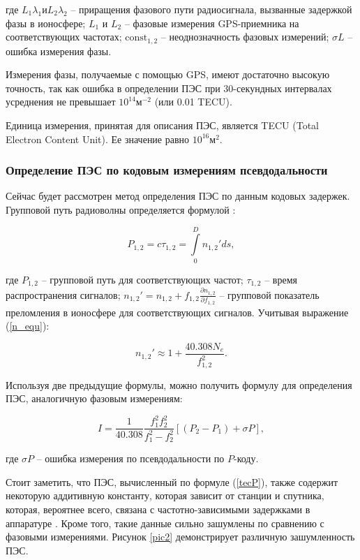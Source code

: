 \documentclass[a4paper]{article}
\begin{document}
где $L_1\lambda_1 \text{и} L_2 \lambda_2$ -- приращения фазового пути радиосигнала, вызванные задержкой фазы в ионосфере; $L_1$ и $L_2$ -- фазовые измерения GPS-приемника на соответствующих частотах; $\text{const}_{1,2}$ -- неоднозначность фазовых измерений; $\sigma L$ -- ошибка измерения фазы.

Измерения фазы, получаемые с помощью GPS, имеют достаточно высокую точность, так как ошибка в определении ПЭС при 30-секундных интервалах усреднения не превышает $10^{14} \text{м}^{-2}$ (или 0.01 TECU). 

Единица измерения, принятая для описания ПЭС, является TECU (Total Electron Content Unit). Ее значение равно $10^{16} \text{м}^2$.

\subsubsection{Определение ПЭС по кодовым измерениям псевдодальности}
Сейчас будет рассмотрен метод определения ПЭС  по данным кодовых задержек. Групповой путь радиоволны определяется формулой \cite{devis}:

\begin{equation}
P_{1,2} = c \tau_{1,2} = \int \limits_{0}^{D} n_{1,2}' ds,
\end{equation}

где $P_{1,2}$ -- групповой путь для соответствующих частот; $\tau_{1,2}$ -- время распространения сигналов; 
$n_{1,2}' = n_{1,2} + f_{1,2} \frac{\partial n_{1,2}}{\partial f_{1,2}}$ -- групповой показатель преломления в ионосфере для соответствующих сигналов. Учитывая выражение (\ref{n_equ}):

\begin{equation}
n_{1,2}' \approx 1 + \frac{40.308 N_e}{f_{1,2}^2}.
\end{equation}

Используя две предыдущие формулы, можно получить формулу для определения ПЭС, аналогичную фазовым измерениям:

\begin{equation}
\label{tecP}
I = \frac{1}{40.308} \frac{f_1^2 f_2^2}{f_1^2 - f_2^2} \left[ \left( P_2 - P_1 \right) + \sigma P \right],
\end{equation} 

где $\sigma P $ -- ошибка измерения по псевдодальности по $P$-коду.

Стоит заметить, что ПЭС, вычисленный по формуле (\ref{tecP}), также содержит некоторую аддитивную константу, которая зависит от станции и спутника, которая, вероятнее всего, связана с частотно-зависимыми задержками в аппаратуре \cite{kozharin}. Кроме того, такие данные сильно зашумлены по сравнению с фазовыми измерениями. Рисунок \ref{pic2} демонстрирует различную зашумленность ПЭС. 
\end{document}
